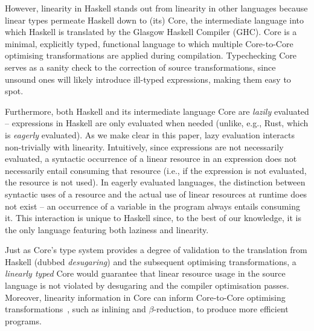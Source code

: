 \documentclass[acmsmall,review,anonymous]{acmart}
\begin{document}
However, linearity in Haskell stands out from linearity in other
languages because linear types permeate Haskell down to (its) Core, the
intermediate language into which Haskell is translated by the Glasgow Haskell Compiler (GHC).
%
Core is a minimal, explicitly typed, functional language to which multiple
Core-to-Core optimising transformations are applied during compilation.
%
Typechecking Core serves as a sanity check to the correction of source
transformations, since unsound ones will likely introduce ill-typed
expressions, making them easy to spot.
%
%

Furthermore, both Haskell and its intermediate language Core are \emph{lazily}
        evaluated -- expressions in Haskell are only evaluated when needed
        (unlike, e.g., Rust, which is \emph{eagerly} evaluated).
        As we make clear in this paper, lazy evaluation interacts non-trivially with linearity.
        Intuitively, since expressions are not necessarily evaluated,
        a syntactic occurrence of a linear resource in an expression does not necessarily
        entail consuming that resource (i.e., if the expression is not evaluated,
        the resource is not used).
%
        In eagerly evaluated languages, the distinction between syntactic uses of a
        resource and the actual use of linear resources at runtime does not exist --
        an occurrence of a variable in the program always entails consuming it.
        This interaction is unique to Haskell since, to the best of
        our knowledge, it is the
        only language featuring both laziness and linearity.

Just as Core's type system provides a degree of validation to the
translation from Haskell (dubbed \emph{desugaring}) and the subsequent
optimising transformations, a \emph{linearly typed} Core would guarantee that
linear resource usage in the source language is not violated by desugaring
and the compiler optimisation passes. Moreover, linearity information in
Core can inform Core-to-Core optimising 
transformations~\cite{cite:let-floating,peytonjones1997a,cite:linearhaskell},
such as inlining and $\beta$-reduction, to produce more efficient programs.
%
%
\end{document}
